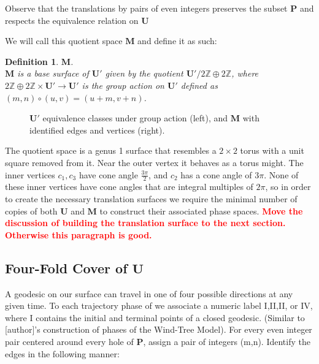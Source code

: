 \documentclass[]{article}
\newtheorem{Def}{Definition}[subsection]
\newcommand{\compat}[1]{\textbf{\textcolor{red}{#1}}}
\begin{document}
Observe that the translations by pairs of even integers preserves the subset $\mathbf P$ and respects the equivalence relation on $\mathbf U$

We will call this quotient space $\mathbf{M}$ and define it as such:
\begin{Def}{$\mathbf{M}$.}\\
$\mathbf{M}$ is a base surface of $\mathbf{U}'$ given by the quotient $\mathbf{U}'/2\mathbb{Z}\oplus2\mathbb{Z}$, where $2\mathbb{Z}\oplus2\mathbb{Z}\times\mathbf{U}'\rightarrow\mathbf{U}'$ is the group action on $\mathbf{U}'$ defined as $(m,n)\circ(u,v)=(u+m,v+n)$.
\end{Def}

\begin{figure}[H]
\begin{center}
\hspace{0.2in}

\end{center}
\caption{$\mathbf{U}'$ equivalence classes under group action (left), and $\mathbf{M}$ with identified edges and vertices (right).}
\label{fig:quotient}
\end{figure}

The quotient space is a genus 1 surface that resembles a $2\times2$ torus with a unit square removed from it. Near the outer vertex it behaves as a torus might. The inner vertices $c_{1},c_{3}$ have cone angle $\frac{3\pi}{2}$, and $c_{2}$ has a cone angle of $3\pi$. None of these inner vertices have cone angles that are integral multiples of $2\pi$, so in order to create the necessary translation surfaces we require the minimal number of copies of both $\mathbf{U}$ and $\mathbf{M}$ to construct their associated phase spaces.  \compat{Move the discussion of building the translation surface to the next section. Otherwise this paragraph is good.}

\subsection{Four-Fold Cover of $\mathbf{U}$}
A geodesic on our surface can travel in one of four possible directions at any given time. To each trajectory phase of we associate a numeric label I,II,II, or IV, where I contains the initial and terminal points of a closed geodesic. (Similar to [author]'s construction of phases of the Wind-Tree Model). For every even integer pair centered around every hole of $\mathbf{P}$, assign a pair of integers (m,n). Identify the edges in the following manner:
\end{document}
